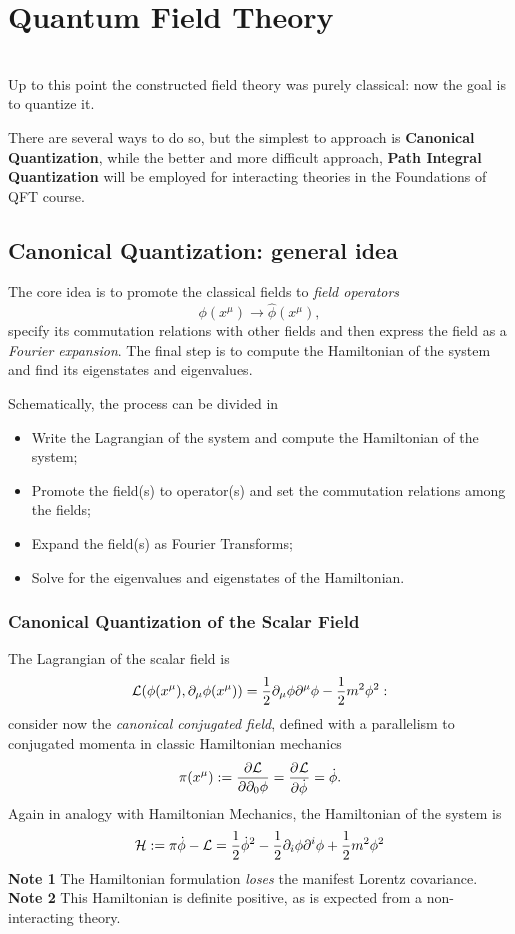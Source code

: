 \newpage
{}
\chapter{Quantum Field Theory}\\

Up to this point the constructed field theory was purely classical:
now the goal is to quantize it.

There are several ways to do so, but the simplest to approach is
\textbf{Canonical Quantization}, while the better and more difficult approach,
\textbf{Path Integral Quantization} will be employed for interacting theories
in the Foundations of QFT course.
\section{Canonical Quantization: general idea}
The core idea is to promote the classical fields to \textit{field operators}
$$\phi(x^\mu) \longrightarrow \hat \phi(x^\mu),$$
specify its commutation relations with other fields and then express
the field as a \textit{Fourier expansion}. The final step is to compute
the Hamiltonian of the system and find its eigenstates and eigenvalues.

Schematically, the process can be divided in
\begin{itemize}
    \item Write the Lagrangian of the system and compute the Hamiltonian of the
        system;
    \item Promote the field(s) to operator(s) and set the commutation relations
        among the fields;
    \item Expand the field(s) as Fourier Transforms;
    \item Solve for the eigenvalues and eigenstates of the Hamiltonian.
\end{itemize}
\subsection{Canonical Quantization of the Scalar Field}
The Lagrangian of the scalar field is
$$\mathcal{L}(\phi(x^\mu),\partial_\mu\phi(x^\mu)) =
\frac{1}{2}\partial_\mu\phi\partial^\mu\phi - \frac{1}{2}m^2\phi^2:$$
consider now the \textit{canonical conjugated field}, defined with a parallelism
to conjugated momenta in classic Hamiltonian mechanics
$$\pi(x^\mu):=\pdv{\mathcal{L}}{\partial_0\phi}=\pdv[]{\mathcal{L}}{\dot\phi}=
\dot\phi.$$
Again in analogy with Hamiltonian Mechanics, the Hamiltonian of the system is
$$\mathcal{H} := \pi\dot\phi-\mathcal{L} = \frac{1}{2}\dot\phi^2 - \frac{1}{2}
\partial_i\phi\partial^i\phi+\frac{1}{2}m^2\phi^2$$
\textbf{Note 1} The Hamiltonian formulation \textit{loses} the manifest Lorentz
covariance.\\
\textbf{Note 2} This Hamiltonian is definite positive, as is expected from a
non-interacting theory.

